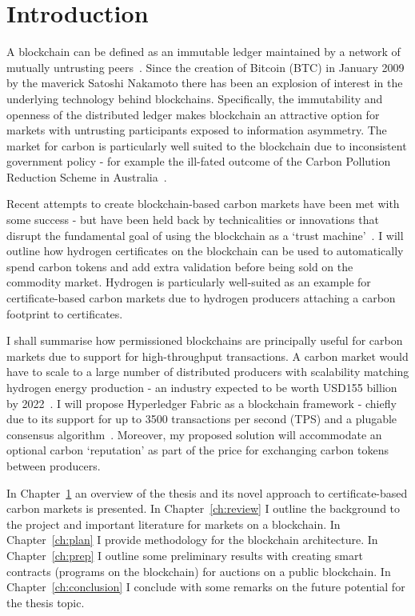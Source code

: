 \chapter{Introduction}\label{ch:intro}
A blockchain can be defined as an immutable ledger maintained by a network of
mutually untrusting peers~\cite{And18}. Since the creation of Bitcoin (BTC) in January 2009
by the maverick Satoshi Nakamoto there has been an explosion of interest in
the underlying technology behind blockchains. Specifically, the
immutability and openness of the distributed ledger makes blockchain an
attractive option for markets with untrusting participants exposed to
information asymmetry. The market for carbon is particularly well suited to
the blockchain due to inconsistent government policy - for example the
ill-fated outcome of the Carbon Pollution Reduction Scheme in
Australia~\cite{Erg13}.

Recent attempts to create blockchain-based carbon markets have been met
with some success - but have been held back by technicalities or innovations
that disrupt the fundamental goal of using the blockchain as a
`trust machine'~\cite{EconT}.
I will outline how hydrogen certificates on the blockchain can be used to
automatically spend carbon tokens and add extra validation before being
sold on the commodity market. Hydrogen is particularly well-suited as an
example for certificate-based carbon markets due to hydrogen producers
attaching a carbon footprint to certificates.

I shall summarise how permissioned blockchains are principally useful for
carbon markets due to support for high-throughput transactions.
A carbon market would have to scale to a large number of distributed
producers with scalability matching hydrogen energy production -
an industry expected to be worth USD155 billion by 2022~\cite{Bru18}.
I will propose
Hyperledger Fabric as a blockchain framework - chiefly due to its support
for up to 3500 transactions per second (TPS) and a plugable consensus
algorithm~\cite{And18}.
Moreover, my proposed solution will accommodate an optional
carbon ‘reputation’ as part of the price for exchanging carbon tokens
between producers.

In Chapter~\ref{ch:intro} an overview of the thesis and its novel
approach to certificate-based carbon markets is presented.
In Chapter~\ref{ch:review} I outline the background to the project and
important literature for markets on a blockchain. In Chapter~\ref{ch:plan}
I provide methodology for the blockchain architecture.
In Chapter~\ref{ch:prep} I outline some preliminary results with
creating smart contracts (programs on the blockchain) for auctions on a
public blockchain. In Chapter~\ref{ch:conclusion} I conclude with some
remarks on the future potential for the thesis topic.


